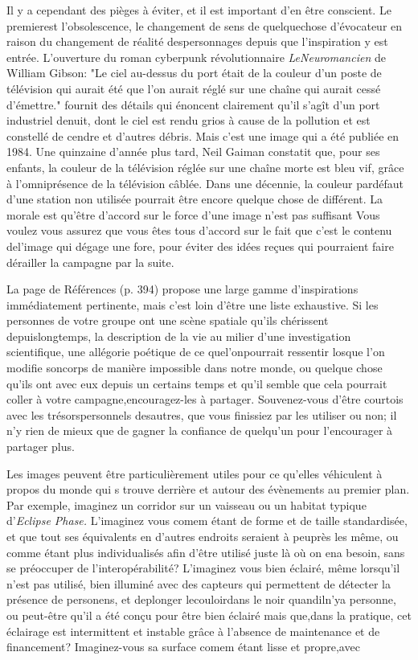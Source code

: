 {Il y a cependant des pièges à éviter, et il est important d'en être conscient. Le premierest l'obsolescence, le changement de sens de quelquechose d'évocateur en raison du changement de réalité despersonnages depuis que l'inspiration y est entrée. L'ouverture du roman cyberpunk révolutionnaire \textit{LeNeuromancien} de William Gibson: "Le ciel au-dessus du port était de la couleur d'un poste de télévision qui aurait été que l'on aurait réglé sur une chaîne qui aurait cessé d'émettre." fournit des détails qui énoncent clairement qu'il s'agît d'un port industriel denuit, dont le ciel est rendu grios à cause de la pollution et est constellé de cendre et d'autres débris. Mais c'est une image qui a été publiée en 1984. Une quinzaine d'année plus tard, Neil Gaiman constatit que, pour ses enfants, la couleur de la télévision réglée sur une chaîne morte est bleu vif, grâce à l'omniprésence de la télévision câblée. Dans une décennie, la couleur pardéfaut d'une station non utilisée pourrait être encore quelque chose de différent. La morale est qu'être d'accord sur le force d'une image n'est pas suffisant Vous voulez vous assurez que vous êtes tous d'accord sur le fait que c'est le contenu del'image qui dégage une fore, pour éviter des idées reçues qui pourraient faire dérailler la campagne par la suite. 

La page de Références (p. 394) propose une large gamme d'inspirations immédiatement pertinente, mais c'est loin d'être une liste exhaustive. Si les personnes de votre groupe ont une scène spatiale qu'ils chérissent depuislongtemps, la description de la vie au milier d'une investigation scientifique, une allégorie poétique de ce quel'onpourrait ressentir losque l'on modifie soncorps de manière impossible dans notre monde, ou quelque chose qu'ils ont avec eux depuis un certains temps et qu'il semble que cela pourrait coller à votre campagne,encouragez-les à partager. Souvenez-vous d'être courtois avec les trésorspersonnels desautres, que vous finissiez par les utiliser ou non; il n'y rien de mieux que de gagner la confiance de quelqu'un pour l'encourager à partager plus. 

Les images peuvent être particulièrement utiles pour ce qu'elles véhiculent à propos du monde qui s trouve derrière et autour des évènements au premier plan. Par exemple, imaginez un corridor sur un vaisseau ou un habitat typique d'\textit{Eclipse Phase. } L'imaginez vous comem étant de forme et de taille standardisée, et que tout ses équivalents en d'autres endroits seraient à peuprès les même, ou comme étant plus individualisés afin d'être utilisé juste là où on ena besoin, sans se préoccuper de l'interopérabilité? L'imaginez vous bien éclairé, même lorsqu'il n'est pas utilisé, bien illuminé avec des capteurs qui permettent de détecter la présence de personens, et deplonger lecouloirdans le noir quandiln'ya personne, ou peut-être qu'il a été conçu pour être bien éclairé mais que,dans la pratique, cet éclairage est intermittent et instable grâce à l'absence de maintenance et de financement? Imaginez-vous sa surface comem étant lisse et propre,avec 

}
